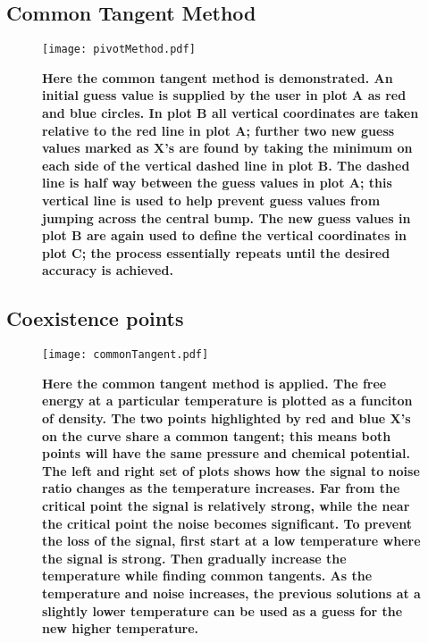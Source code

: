 \subsection{Common Tangent Method}
\begin{figure}[h!]
\vspace*{-7mm}
\hspace*{-6mm}
	\centering
	\texttt{[image: pivotMethod.pdf]}
	\caption{\label{fig:pivotMethod}
	\scriptsize \textbf{Here the common tangent method is demonstrated. An initial guess value is supplied by the user in plot A as red and blue circles. In plot B all vertical coordinates are taken relative to the red line in plot A; further two new guess values marked as X's are found by taking the minimum on each side of the vertical dashed line in plot B. The dashed line is half way between the guess values in plot A; this vertical line is used to help prevent guess values from jumping across the central bump. The new guess values in plot B are again used to define the vertical coordinates in plot C; the process essentially repeats until the desired accuracy is achieved.}}
	
\end{figure}
\newpage
\vspace*{-7mm}
\subsection{Coexistence points}
\vspace*{-7mm}
\begin{figure}[!h]

\hspace*{-6mm}
	\centering
	\texttt{[image: commonTangent.pdf]}
	\caption{\scriptsize \textbf{Here the common tangent method is applied. The free energy at a particular temperature is plotted as a funciton of density. The two points highlighted by red and blue X's on the curve share a common tangent; this means both points will have the same pressure and chemical potential. The left and right set of plots shows how the signal to noise ratio changes as the temperature increases. Far from the critical point the signal is relatively strong, while the near the critical point the noise becomes significant. To prevent the loss of the signal, first start at a low temperature where the signal is strong. Then gradually increase the temperature while finding common tangents. As the temperature and noise increases, the previous solutions at a slightly lower temperature can be used as a guess for the new higher temperature.}}
	\label{fig:FdispVsff}
\end{figure}




